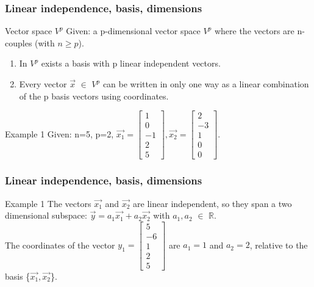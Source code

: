 \begin{frame}
	\frametitle{Linear independence, basis, dimensions}
	\begin{block}{Vector space $V^p$}
		Given: a p-dimensional vector space $V^p$ where the vectors are n-couples (with $n\geq p$).
		\begin{enumerate}
			\item In $V^p$ exists a basis with p linear independent vectors.
			\item Every vector $\overrightarrow{x}$ $\in$ $V^p$ can be written in only one way as a linear combination of the p basis vectors using coordinates.
		\end{enumerate}	
	\end{block}
	\begin{block}{Example 1}
		Given: n=5, p=2, $\overrightarrow{x_1}=\begin{bmatrix} 1\\0\\-1\\2\\5\end{bmatrix}, \overrightarrow{x_2}=\begin{bmatrix} 2\\-3\\1\\0\\0\end{bmatrix}$.\\
	\end{block}
\end{frame}

\begin{frame}
	\frametitle{Linear independence, basis, dimensions}
	\begin{block}{Example 1}
		The vectors $\overrightarrow{x_1}$ and $\overrightarrow{x_2}$ are linear independent, so they span a two dimensional subspace: $\overrightarrow{y}=a_1\overrightarrow{x_1}+a_2\overrightarrow{x_2}$ with $a_1, a_2$ $\in$ $\mathbb{R}$.\\
		The coordinates of the vector $y_1=\begin{bmatrix} 5\\-6\\1\\2\\5\end{bmatrix}$ are $a_1=1$ and $a_2=2$, relative to the basis \{$\overrightarrow{x_1},\overrightarrow{x_2}$\}.
	\end{block}
\end{frame}

